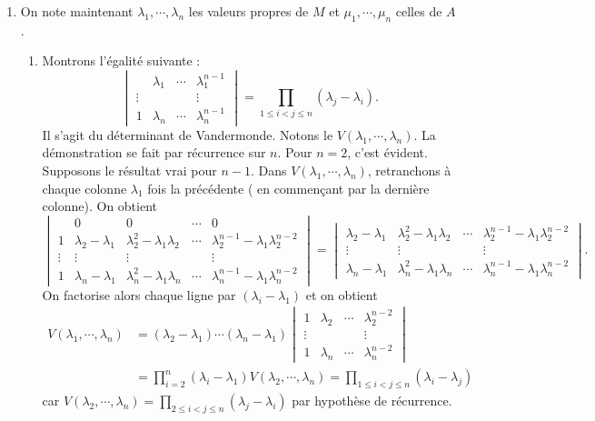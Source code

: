 {{\begin {enumerate}
  \item On note maintenant $\lambda_1,\cdots,\lambda_n$ les valeurs propres de $M$ et 
$\mu_1,\cdots,\mu_n$ celles de $A$.
  \begin {enumerate}
    \item  Montrons l'\'egalit\'e suivante :
$$\begin{vmatrix} &\lambda_1 &\cdots &\lambda_1^{n-1} \\ 
\vdots& & &\vdots \\  1 &\lambda_n &\cdots & \lambda_n^{n-1}\end{vmatrix}=
\prod_{1\leq i<j\leq n}(\lambda_j-\lambda_i).$$
Il s'agit du d\'eterminant de Vandermonde. Notons le $V(\lambda_1,\cdots,\lambda_n)$. La d\'emonstration se fait par r\'ecurrence sur $n$.
Pour $n=2$, c'est \'evident. Supposons le r\'esultat vrai pour $n-1$. Dans $V(\lambda_1,\cdots,\lambda_n)$, retranchons \`a chaque colonne $\lambda_1$ fois la pr\'ec\'edente ( en commen\c cant par la derni\`ere colonne). On obtient 
$$\begin{vmatrix}
&0&0&\cdots&0 \\ 
1& \lambda_2-\lambda_1&\lambda_2^2-\lambda_1\lambda_2&\cdots&\lambda_2^{n-1}-\lambda_1\lambda_2^{n-2} \\  \vdots&\vdots&\vdots& &\vdots \\  1&\lambda_n-\lambda_1&\lambda_n^2-\lambda_1\lambda_n&\cdots&\lambda_n^{n-1}-\lambda_1\lambda_n^{n-2}
\end{vmatrix}
=
\begin{vmatrix}
\lambda_2-\lambda_1&\lambda_2^2-\lambda_1\lambda_2&\cdots&\lambda_2^{n-1}-\lambda_1\lambda_2^{n-2} \\ 
\vdots&\vdots& &\vdots \\ \lambda_n-\lambda_1&\lambda_n^2-\lambda_1\lambda_n&\cdots&\lambda_n^{n-1}-\lambda_1\lambda_n^{n-2}
\end{vmatrix}.$$
On factorise alors chaque ligne par $(\lambda_i-\lambda_1)$ et on obtient
$$\begin{aligned}
V(\lambda_1,\cdots,\lambda_n)&=(\lambda_2-\lambda_1)\cdots(\lambda_n-\lambda_1)
\begin{vmatrix}1 &\lambda_2 &\cdots &\lambda_2^{n-2} \\ 
\vdots& & &\vdots \\  1 &\lambda_n &\cdots & \lambda_n^{n-2}\end{vmatrix} \\ 
&= \prod_{i=2}^n(\lambda_i-\lambda_1)V(\lambda_2,\cdots,\lambda_n)=\prod_{1\leq i<j\leq n}(\lambda_i-\lambda_j)
\end{aligned}$$
car $V(\lambda_2,\cdots,\lambda_n)=\prod_{2\leq i<j\leq n}(\lambda_j-\lambda_i)$ 
par hypoth\`ese de r\'ecurrence.



\end{enumerate}
\end{enumerate}}}
